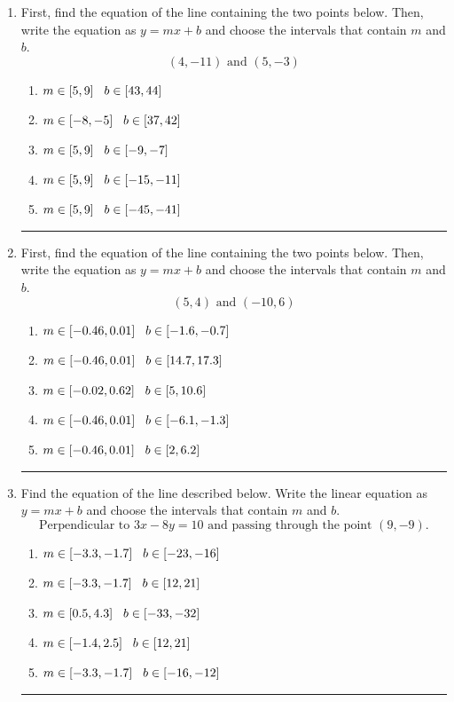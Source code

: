 \documentclass[14pt]{extbook}
\newcommand{\litem}[1]{\item#1\hspace*{-1cm}\rule{\textwidth}{0.4pt}}
\begin{document}
\begin{enumerate}
{\begin{enumerate}[label=\Alph*.]
\end{enumerate} }
\litem{
First, find the equation of the line containing the two points below. Then, write the equation as $ y=mx+b $ and choose the intervals that contain $m$ and $b$.\[ (4, -11) \text{ and } (5, -3) \]\begin{enumerate}[label=\Alph*.]
\item \( m \in [5, 9] \hspace*{3mm} b \in [43, 44] \)
\item \( m \in [-8, -5] \hspace*{3mm} b \in [37, 42] \)
\item \( m \in [5, 9] \hspace*{3mm} b \in [-9, -7] \)
\item \( m \in [5, 9] \hspace*{3mm} b \in [-15, -11] \)
\item \( m \in [5, 9] \hspace*{3mm} b \in [-45, -41] \)

\end{enumerate} }
\litem{
First, find the equation of the line containing the two points below. Then, write the equation as $ y=mx+b $ and choose the intervals that contain $m$ and $b$.\[ (5, 4) \text{ and } (-10, 6) \]\begin{enumerate}[label=\Alph*.]
\item \( m \in [-0.46, 0.01] \hspace*{3mm} b \in [-1.6, -0.7] \)
\item \( m \in [-0.46, 0.01] \hspace*{3mm} b \in [14.7, 17.3] \)
\item \( m \in [-0.02, 0.62] \hspace*{3mm} b \in [5, 10.6] \)
\item \( m \in [-0.46, 0.01] \hspace*{3mm} b \in [-6.1, -1.3] \)
\item \( m \in [-0.46, 0.01] \hspace*{3mm} b \in [2, 6.2] \)

\end{enumerate} }
\litem{
Find the equation of the line described below. Write the linear equation as $ y=mx+b $ and choose the intervals that contain $m$ and $b$.\[ \text{Perpendicular to } 3 x - 8 y = 10 \text{ and passing through the point } (9, -9). \]\begin{enumerate}[label=\Alph*.]
\item \( m \in [-3.3, -1.7] \hspace*{3mm} b \in [-23, -16] \)
\item \( m \in [-3.3, -1.7] \hspace*{3mm} b \in [12, 21] \)
\item \( m \in [0.5, 4.3] \hspace*{3mm} b \in [-33, -32] \)
\item \( m \in [-1.4, 2.5] \hspace*{3mm} b \in [12, 21] \)
\item \( m \in [-3.3, -1.7] \hspace*{3mm} b \in [-16, -12] \)


\end{enumerate}}
\end{enumerate}
\end{document}
